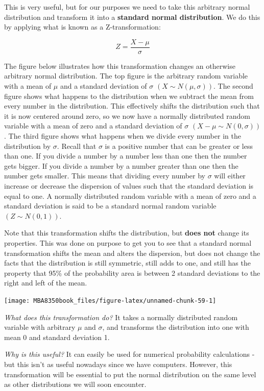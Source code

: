 \documentclass[
]{book}
\begin{document}
This is very useful, but for our purposes we need to take this arbitrary normal distribution and transform it into a \textbf{standard normal distribution}. We do this by applying what is known as a Z-transformation:

\[Z=\frac{X-\mu}{\sigma}\]

The figure below illustrates how this transformation changes an otherwise arbitrary normal distribution. The top figure is the arbitrary random variable with a mean of \(\mu\) and a standard deviation of \(\sigma\) \((X \sim N(\mu,\sigma))\). The second figure shows what happens to the distribution when we subtract the mean from every number in the distribution. This effectively shifts the distribution such that it is now centered around zero, so we now have a normally distributed random variable with a mean of zero and a standard deviation of \(\sigma\) \((X-\mu \sim N(0,\sigma))\). The third figure shows what happens when we divide every number in the distribution by \(\sigma\). Recall that \(\sigma\) is a positive number that can be greater or less than one. If you divide a number by a number less than one then the number gets bigger. If you divide a number by a number greater than one then the number gets smaller. This means that dividing every number by \(\sigma\) will either increase or decrease the dispersion of values such that the standard deviation is equal to one. A normally distributed random variable with a mean of zero and a standard deviation is said to be a standard normal random variable \((Z \sim N(0,1))\).

Note that this transformation shifts the distribution, but \textbf{does not} change its properties. This was done on purpose to get you to see that a standard normal transformation shifts the mean and alters the dispersion, but does not change the facts that the distribution is still symmetric, still adds to one, and still has the property that 95\% of the probability area is between 2 standard deviations to the right and left of the mean.

\begin{center}\texttt{[image: MBA8350book\_files/figure-latex/unnamed-chunk-59-1]} \end{center}

\emph{What does this transformation do?} It takes a normally distributed random variable with arbitrary \(\mu\) and \(\sigma\), and transforms the distribution into one with mean 0 and standard deviation 1.

\emph{Why is this useful?} It can easily be used for numerical probability calculations - but this isn't as useful nowadays since we have computers. However, this transformation will be essential to put the normal distribution on the same level as other distributions we will soon encounter.
\end{document}
